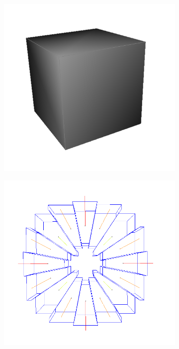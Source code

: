 \documentclass{beamer}
\begin{document}
\begin{frame}
    \begin{figure}
        \centering
        \begin{subfigure}{.3\textwidth}
            \centering
            \includegraphics[scale=0.2]{img/cube}
        \end{subfigure}
        \begin{subfigure}{.3\textwidth}
            \centering
            \includegraphics[scale=0.15]{img/circle-cube-inter}

\end{subfigure}
\end{figure}
\end{frame}
\end{document}
